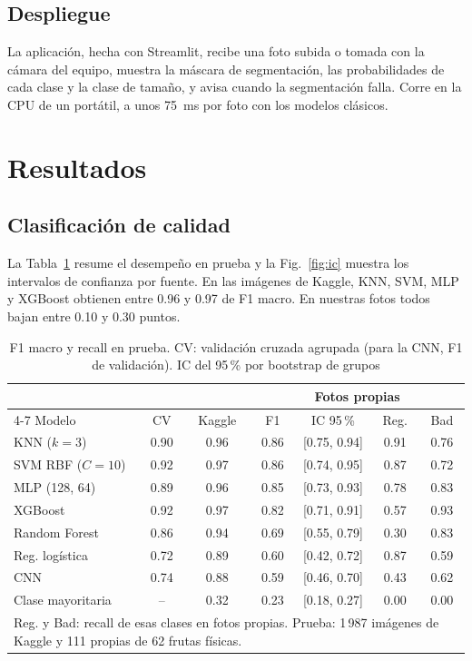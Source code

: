 \documentclass[conference]{IEEEtran}
\begin{document}
\subsection{Despliegue}
La aplicación, hecha con Streamlit, recibe una foto subida o tomada con la cámara del equipo, muestra la máscara de segmentación, las probabilidades de cada clase y la clase de tamaño, y avisa cuando la segmentación falla. Corre en la CPU de un portátil, a unos 75~ms por foto con los modelos clásicos.

\section{Resultados}
\label{sec:resultados}

\subsection{Clasificación de calidad}
La Tabla~\ref{tab:resultados} resume el desempeño en prueba y la Fig.~\ref{fig:ic} muestra los intervalos de confianza por fuente. En las imágenes de Kaggle, KNN, SVM, MLP y XGBoost obtienen entre 0.96 y 0.97 de F1 macro. En nuestras fotos todos bajan entre 0.10 y 0.30 puntos.

\begin{table}[t]
\caption{F1 macro y recall en prueba. CV: validación cruzada agrupada (para la CNN, F1 de validación). IC del 95\,\% por bootstrap de grupos}
\label{tab:resultados}
\centering
\footnotesize
\setlength{\tabcolsep}{3pt}
\begin{tabular}{lcccccc}
\toprule
 & & & \multicolumn{4}{c}{Fotos propias} \\
\cmidrule(lr){4-7}
Modelo & CV & Kaggle & F1 & IC 95\,\% & Reg. & Bad \\
\midrule
KNN ($k=3$) & 0.90 & 0.96 & 0.86 & [0.75, 0.94] & 0.91 & 0.76 \\
SVM RBF ($C=10$) & 0.92 & 0.97 & 0.86 & [0.74, 0.95] & 0.87 & 0.72 \\
MLP (128, 64) & 0.89 & 0.96 & 0.85 & [0.73, 0.93] & 0.78 & 0.83 \\
XGBoost & 0.92 & 0.97 & 0.82 & [0.71, 0.91] & 0.57 & 0.93 \\
Random Forest & 0.86 & 0.94 & 0.69 & [0.55, 0.79] & 0.30 & 0.83 \\
Reg. logística & 0.72 & 0.89 & 0.60 & [0.42, 0.72] & 0.87 & 0.59 \\
CNN & 0.74 & 0.88 & 0.59 & [0.46, 0.70] & 0.43 & 0.62 \\
Clase mayoritaria & -- & 0.32 & 0.23 & [0.18, 0.27] & 0.00 & 0.00 \\
\bottomrule
\multicolumn{7}{p{0.95\columnwidth}}{\scriptsize Reg. y Bad: recall de esas clases en fotos propias. Prueba: 1\,987 imágenes de Kaggle y 111 propias de 62 frutas físicas.}
\end{tabular}
\end{table}
\end{document}
